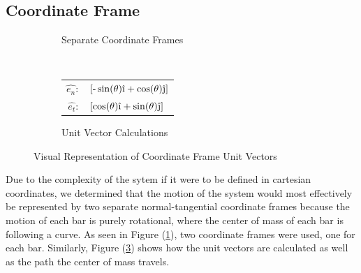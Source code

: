 \documentclass[12pt]{report}
\begin{document}
\begin{flushleft}
\section{Coordinate Frame}
\begin{figure}[ht]
    \begin{subfigure}[t]{.5\textwidth}
      \center
      \caption{Separate Coordinate Frames}
      \label{coord:a}
      
      \vspace{2ex}
    \end{subfigure}%
\begin{subfigure}[t]{.5\textwidth}
      \center
      \caption{Unit Vector Calculations}
      \label{coord:b}
       \\
      \begin{tabular}{rl}
        $\hat{e_n}:$ & $\left[\textrm{-}\sin(\theta)\hat{\textrm{\i}}+\cos(\theta)\hat{\textrm{\j}}\right]$ \\
        $\hat{e_t}:$ & $\left[\cos(\theta)\hat{\textrm{\i}}+\sin(\theta)\hat{\textrm{\j}}\right]$ \\
      \end{tabular}
    \end{subfigure}
    \caption{Visual Representation of Coordinate Frame Unit Vectors}
\end{figure}
Due to the complexity of the sytem if it were to be defined in cartesian coordinates,
we determined that the motion of the system would most effectively be represented by two separate
normal-tangential coordinate frames because the motion of each bar is purely rotational, where the
center of mass of each bar is following a curve. As seen in Figure (\ref{coord:a}), two coordinate
frames were used, one for each bar. Similarly, Figure (\ref{coord:b}) shows how the
unit vectors are calculated as well as the path the center of mass travels.
\newpage


\end{flushleft}
\end{document}
